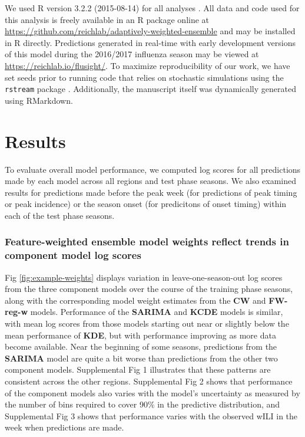 \documentclass[10pt,letterpaper]{article}
\begin{document}
We used R version 3.2.2 (2015-08-14) for all analyses \cite{Rcore2015}.
All data and code used for this analysis is freely available in an R
package online at
\url{https://github.com/reichlab/adaptively-weighted-ensemble} and may
be installed in R directly. Predictions generated in real-time with
early development versions of this model during the 2016/2017 influenza
season may be viewed at \url{https://reichlab.io/flusight/}. To maximize
reproducibility of our work, we have set seeds prior to running code
that relies on stochastic simulations using the \texttt{rstream} package
\cite{Leydold2015}. Additionally, the manuscript itself was dynamically
generated using RMarkdown.

\section{Results}\label{results}

To evaluate overall model performance, we computed log scores for all
predictions made by each model across all regions and test phase
seasons. We also examined results for predictions made before the peak
week (for predictions of peak timing or peak incidence) or the season
onset (for predicitons of onset timing) within each of the test phase
seasons.

\subsubsection{Feature-weighted ensemble model weights reflect trends in
component model log
scores}\label{feature-weighted-ensemble-model-weights-reflect-trends-in-component-model-log-scores}

Fig \ref{fig:example-weights} displays variation in leave-one-season-out
log scores from the three component models over the course of the
training phase seasons, along with the corresponding model weight
estimates from the \textbf{CW} and \textbf{FW-reg-w} models. Performance
of the \textbf{SARIMA} and \textbf{KCDE} models is similar, with mean
log scores from those models starting out near or slightly below the
mean performance of \textbf{KDE}, but with performance improving as more
data become available. Near the beginning of some seasons, predictions
from the \textbf{SARIMA} model are quite a bit worse than predictions
from the other two component models. Supplemental Fig 1 illustrates that
these patterns are consistent across the other regions. Supplemental Fig
2 shows that performance of the component models also varies with the
model's uncertainty as measured by the number of bins required to cover
90\% in the predictive distribution, and Supplemental Fig 3 shows that
performance varies with the observed wILI in the week when predictions
are made.
\end{document}
